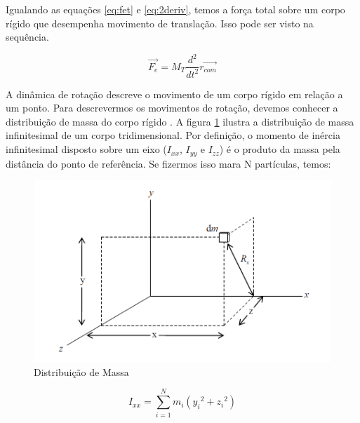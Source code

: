 Igualando as equações \ref{eq:fet} e \ref{eq:2deriv}, temos a força total sobre um corpo rígido que desempenha movimento de translação. Isso pode ser visto na sequência.

\begin{equation}
\vec{F_e}=M_{T}\frac{{d}^{2}}{{d}t^{2}}\vec{r_{com}} 
\end{equation}




A dinâmica de rotação descreve o movimento de um corpo rígido em relação a um ponto. Para descrevermos os movimentos de rotação, devemos conhecer a distribuição de massa do corpo rígido \cite{Snider}. A figura \ref{fig:mass_snider_p16} ilustra a distribuição de massa infinitesimal de um corpo tridimensional. Por definição, o momento de inércia infinitesimal disposto sobre um eixo ($I_{xx}$, $I_{yy}$ e $I_{zz}$) é o produto da massa pela distância do ponto de referência. Se fizermos isso mara N partículas, temos:

\begin{figure}[!ht]
  \caption{Distribuição de Massa}
  \begin{center}
      \includegraphics[scale=0.5]{img/mass_snider_p16}
  \end{center}
  \label{fig:mass_snider_p16}
\end{figure}


\begin{equation}
  I_{xx}=\sum_{i=1}^{N}{m_i({y_i}^{2}+{z_i}^{2})}
\end{equation}


